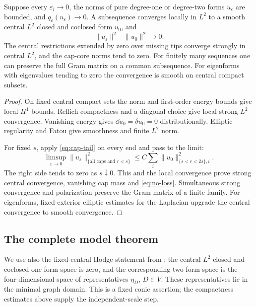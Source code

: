 \begin{proposition}\label{prop:no-loss-compactness}
Suppose every $\varepsilon_i\to0$, the norms of pure degree-one or
degree-two forms $u_\varepsilon$ are bounded, and
$q_\varepsilon(u_\varepsilon)\to0$. A subsequence converges locally
in $L^2$ to a smooth central $L^2$ closed and coclosed form $u_0$,
and
\begin{equation}\label{eq:no-loss}
 \|u_\varepsilon\|^2-\|u_0\|^2\longrightarrow0.
\end{equation}
The central restrictions extended by zero over missing tips converge
strongly in central $L^2$, and the cap-core norms tend to zero.
For finitely many sequences one can preserve the full Gram matrix
on a common subsequence. For eigenforms with eigenvalues tending
to zero the convergence is smooth on central compact subsets.
\end{proposition}
\begin{proof}
On fixed central compact sets the norm and first-order energy bounds
give local $H^1$ bounds. Rellich compactness and a diagonal choice
give local strong $L^2$ convergence. Vanishing energy gives
$\dd u_0=\delta u_0=0$ distributionally. Elliptic regularity and
Fatou give smoothness and finite $L^2$ norm.

For fixed $s$, apply \eqref{eq:cap-tail} on every end and pass to
the limit:
\[
 \limsup_{\varepsilon\to0}
    \|u_\varepsilon\|^2_{\{\text{all caps and }r<s\}}
       \le C\sum_i\|u_0\|^2_{\{s<r<2s\},i}.
\]
The right side tends to zero as $s\downarrow0$. This and the
local convergence prove strong central convergence, vanishing cap
mass and \eqref{eq:no-loss}. Simultaneous strong convergence and
polarization preserve the Gram matrix of a finite family.
For eigenforms, fixed-exterior elliptic estimates for the Laplacian
upgrade the central convergence to smooth convergence.
\end{proof}

\subsection{The complete model theorem}

We use also the fixed-central Hodge statement from
\cite[Section~5]{wuebben-hodge}: the central $L^2$ closed and coclosed
one-form space is zero, and the corresponding two-form space is the
four-dimensional space of representatives $\eta_D$, $D\in V$.
These representatives lie in the minimal graph domain. This is a
fixed conic assertion; the compactness estimates above supply the
independent-scale step.

